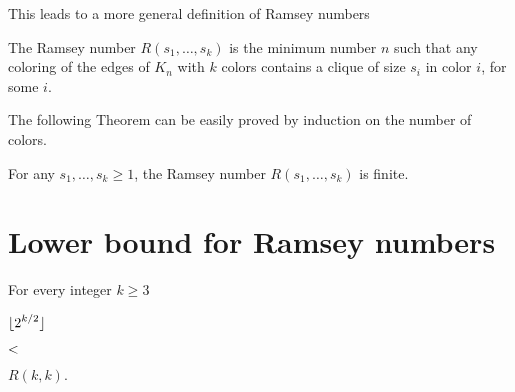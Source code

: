 \documentclass[scombinatorics.tex]{subfiles}
\begin{document}
This leads to a more general definition of Ramsey numbers

\begin{definition}
  The Ramsey number $R(s_1,\dots,s_k)$ is the minimum number $n$ such that any coloring of the edges of $K_n$ with $k$ colors contains a clique of size $s_i$ in color $i$, for some $i$.\QED
\end{definition}

The following Theorem can be easily proved by induction on the number of colors.

\begin{theorem}
  For any $s_1,\dots,s_k\ge1$, the Ramsey number $R(s_1,\dots,s_k)$ is finite.\QED
\end{theorem}

\section{Lower bound for Ramsey numbers}

\def\medrel#1{\parbox[t]{5ex}{$\displaystyle\hfil #1$}}
\def\ceq#1#2#3{\parbox[t]{35ex}{$\displaystyle #1$}\medrel{#2}{$\displaystyle #3$}}

\begin{theorem}
    For every integer $k\ge 3$
    
    \ceq{\hfill\lfloor2^{k/2}\rfloor}{<}{R(k,k).}
\end{theorem}
\end{document}
